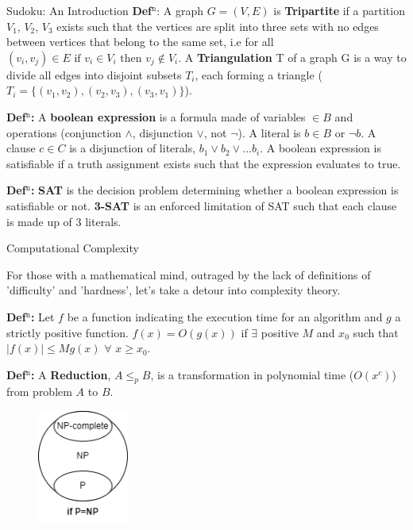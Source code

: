 \documentclass[final]{beamer}
\newlength{\colwidth}
\newcounter{col}
\begin{document}
\begin{frame}[t]
\begin{columns}[t]
\begin{column}{\colwidth}
\begin{exampleblock}{Sudoku: An Introduction}
\textbf{Def$^\text{n}$}: A graph $G=(V,E)$ is \textbf{Tripartite} if a partition $V_1$, $V_2$, $V_3$ exists such that the vertices are split into three sets with no edges between vertices that belong to the same set, i.e for all $(v_i,v_j) \in E\text{ if } v_i \in V_i\text{ then }v_j \not\in V_i $. A \textbf{Triangulation} T of a graph G is a way to divide all edges into disjoint subsets $T_i$, each forming a triangle ($T_i=\{(v_{1}, v_{2}),(v_{2}, v_{3}),(v_{3},v_{1})\}$).

\textbf{Def$^\text{n}$:} A \textbf{boolean expression} is a formula made of variables $\in B$ and operations (conjunction $\land$, disjunction $\lor$, not $\neg$). A literal is $b\in B$ or $\neg b$. A clause $c\in C$ is a disjunction of literals, $b_1 \lor b_2 \lor ... b_i$. A boolean expression is satisfiable if a truth assignment exists such that the expression evaluates to true. 

\textbf{Def$^\text{n}$:}  \textbf{SAT} is the decision problem determining whether a boolean expression is satisfiable or not. \textbf{3-SAT} is an enforced limitation of SAT such that each clause is made up of 3 literals. 
  \end{exampleblock}
 \begin{block}{Computational Complexity \cite{arora2006computational}}


For those with a mathematical mind, outraged by the lack of definitions of 'difficulty' and 'hardness', let's take a detour into complexity theory. 

\textbf{Def$^\text{n}$:} Let $f$ be a function indicating the execution time for an algorithm and $g$ a strictly positive function. $f(x)=O (g(x))$ if $\exists$ positive $ M$ and $x_0$ such that $|f(x)|\leq Mg(x)$ $\forall$ $x\geq x_0$.

\textbf{Def$^\text{n}$:} A \textbf{Reduction}, $A \leq_p B$, is a transformation in polynomial time ($O(x^c)$) from problem $A$ to $B$.

\begin{figure}
		\vspace{-5pt}
		\includegraphics[width=30mm]{np.png}
		\vspace{-40pt}
\end{figure}


\end{block}
\end{column}
\end{columns}
\end{frame}
\end{document}
